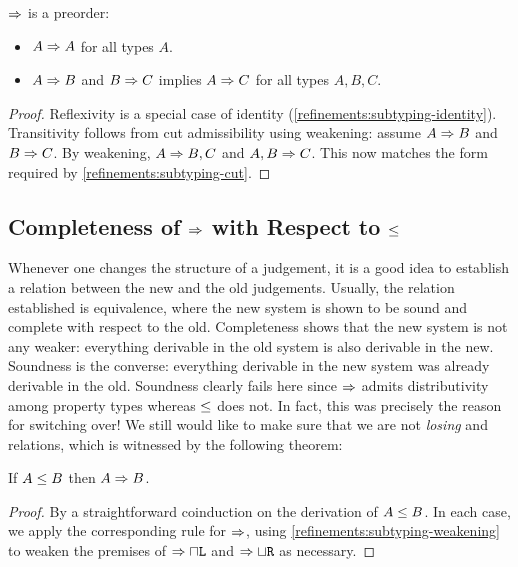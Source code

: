 \begin{corollary}
  \label{refinements:sub-is-preorder}
  $\mathrel\Rightarrow$ is a preorder:
  \begin{itemize}
    \item $A \mathrel\Rightarrow A$ for all types $A$.
    \item $A \mathrel\Rightarrow B$ and $B \mathrel\Rightarrow C$ implies $A \mathrel\Rightarrow C$ for all types $A, B, C$.
  \end{itemize}
\end{corollary}
\begin{proof}
  Reflexivity is a special case of identity (\cref{refinements:subtyping-identity}). Transitivity follows from cut admissibility using weakening: assume $A \mathrel\Rightarrow B$ and $B \mathrel\Rightarrow C$. By weakening, $A \mathrel\Rightarrow B, C$ and $A, B \mathrel\Rightarrow C$. This now matches the form required by \cref{refinements:subtyping-cut}.
\end{proof}


\subsection{Completeness of $\mathrel\Rightarrow$ with Respect to $\le$}

Whenever one changes the structure of a judgement, it is a good idea to establish a relation between the new and the old judgements. Usually, the relation established is equivalence, where the new system is shown to be sound and complete with respect to the old. Completeness shows that the new system is not any weaker: everything derivable in the old system is also derivable in the new. Soundness is the converse: everything derivable in the new system was already derivable in the old. Soundness clearly fails here since $\mathrel\Rightarrow$ admits distributivity among property types whereas $\le$ does not. In fact, this was precisely the reason for switching over! We still would like to make sure that we are not \emph{losing} and relations, which is witnessed by the following theorem:

\begin{theorem}
  If $A \le B$ then $A \mathrel\Rightarrow B$.
\end{theorem}
\begin{proof}
  By a straightforward coinduction on the derivation of $A \le B$. In each case, we apply the corresponding rule for $\mathrel\Rightarrow$, using \cref{refinements:subtyping-weakening} to weaken the premises of $\mathrel\Rightarrow{\mathbin{\sqcap}\texttt{L}}$ and $\mathrel\Rightarrow{\mathbin{\sqcup}\texttt{R}}$ as necessary.
\end{proof}

